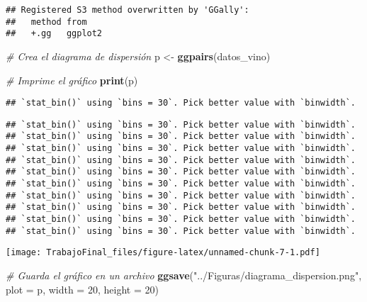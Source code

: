 \documentclass[
]{article}
\newenvironment{Shaded}{\begin{snugshade}}{\end{snugshade}}
\newcommand{\AttributeTok}[1]{\textcolor[rgb]{0.13,0.29,0.53}{#1}}
\newcommand{\CommentTok}[1]{\textcolor[rgb]{0.56,0.35,0.01}{\textit{#1}}}
\newcommand{\DecValTok}[1]{\textcolor[rgb]{0.00,0.00,0.81}{#1}}
\newcommand{\FunctionTok}[1]{\textcolor[rgb]{0.13,0.29,0.53}{\textbf{#1}}}
\newcommand{\NormalTok}[1]{#1}
\newcommand{\OtherTok}[1]{\textcolor[rgb]{0.56,0.35,0.01}{#1}}
\newcommand{\StringTok}[1]{\textcolor[rgb]{0.31,0.60,0.02}{#1}}
\begin{document}
\begin{verbatim}
## Registered S3 method overwritten by 'GGally':
##   method from   
##   +.gg   ggplot2
\end{verbatim}

\begin{Shaded}
\begin{Highlighting}[]
\CommentTok{\# Crea el diagrama de dispersión}
\NormalTok{p }\OtherTok{\textless{}{-}} \FunctionTok{ggpairs}\NormalTok{(datos\_vino)}

\CommentTok{\# Imprime el gráfico}
\FunctionTok{print}\NormalTok{(p)}
\end{Highlighting}
\end{Shaded}

\begin{verbatim}
## `stat_bin()` using `bins = 30`. Pick better value with `binwidth`.
\end{verbatim}

\begin{verbatim}
## `stat_bin()` using `bins = 30`. Pick better value with `binwidth`.
## `stat_bin()` using `bins = 30`. Pick better value with `binwidth`.
## `stat_bin()` using `bins = 30`. Pick better value with `binwidth`.
## `stat_bin()` using `bins = 30`. Pick better value with `binwidth`.
## `stat_bin()` using `bins = 30`. Pick better value with `binwidth`.
## `stat_bin()` using `bins = 30`. Pick better value with `binwidth`.
## `stat_bin()` using `bins = 30`. Pick better value with `binwidth`.
## `stat_bin()` using `bins = 30`. Pick better value with `binwidth`.
## `stat_bin()` using `bins = 30`. Pick better value with `binwidth`.
## `stat_bin()` using `bins = 30`. Pick better value with `binwidth`.
\end{verbatim}

\texttt{[image: TrabajoFinal\_files/figure-latex/unnamed-chunk-7-1.pdf]}

\begin{Shaded}
\begin{Highlighting}[]
\CommentTok{\# Guarda el gráfico en un archivo}
\FunctionTok{ggsave}\NormalTok{(}\StringTok{"../Figuras/diagrama\_dispersion.png"}\NormalTok{, }\AttributeTok{plot =}\NormalTok{ p, }\AttributeTok{width =} \DecValTok{20}\NormalTok{, }\AttributeTok{height =} \DecValTok{20}\NormalTok{)}
\end{Highlighting}
\end{Shaded}
\end{document}
